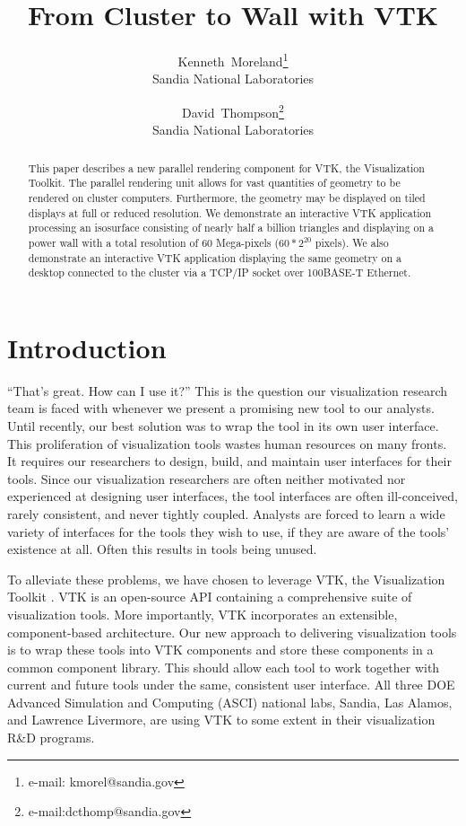 \documentclass{acmsiggraph}
\title{From Cluster to Wall with VTK}
\author{Kenneth~Moreland\thanks{e-mail: kmorel@sandia.gov}\\ Sandia
  National Laboratories \and
  David~Thompson\thanks{e-mail:dcthomp@sandia.gov}\\ Sandia National
  Laboratories}
\begin{document}
  \maketitle

  \begin{abstract}
    This paper describes a new parallel rendering component for VTK, the
    Visualization Toolkit.  The parallel rendering unit allows for vast
    quantities of geometry to be rendered on cluster computers.
    Furthermore, the geometry may be displayed on tiled displays at full or
    reduced resolution.  We demonstrate an interactive VTK application
    processing an isosurface consisting of nearly half a billion triangles
    and displaying on a power wall with a total resolution of 60
    Mega-pixels ($60*2^{20}$ pixels).  We also demonstrate an interactive
    VTK application displaying the same geometry on a desktop connected to
    the cluster via a TCP/IP socket over 100BASE-T Ethernet.
  \end{abstract}

  \begin{CRcatlist}
  \end{CRcatlist}

  \keywordlist

  \copyrightspace

  \section{Introduction}
  \label{sec:introduction}

  ``That's great.  How can I use it?''  This is the question our
  visualization research team is faced with whenever we present a promising
  new tool to our analysts.  Until recently, our best solution was to wrap
  the tool in its own user interface.  This proliferation of visualization
  tools wastes human resources on many fronts.  It requires our researchers
  to design, build, and maintain user interfaces for their tools.  Since
  our visualization researchers are often neither motivated nor experienced
  at designing user interfaces, the tool interfaces are often
  ill-conceived, rarely consistent, and never tightly coupled.  Analysts
  are forced to learn a wide variety of interfaces for the tools they wish
  to use, if they are aware of the tools' existence at all.  Often this
  results in tools being unused.

  To alleviate these problems, we have chosen to leverage VTK, the
  Visualization Toolkit \cite{Schroeder98}.  VTK is an open-source API
  containing a comprehensive suite of visualization tools.  More
  importantly, VTK incorporates an extensible, component-based
  architecture.  Our new approach to delivering visualization tools is to
  wrap these tools into VTK components and store these components in a
  common component library.  This should allow each tool to work together
  with current and future tools under the same, consistent user interface.
  All three DOE Advanced Simulation and Computing (ASCI) national labs,
  Sandia, Las Alamos, and Lawrence Livermore, are using VTK to some extent
  in their visualization R\&D programs.
\end{document}
